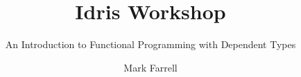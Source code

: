 \title{Idris Workshop}
\subtitle{\small{An Introduction to Functional Programming with Dependent Types}}
\author{Mark Farrell}


